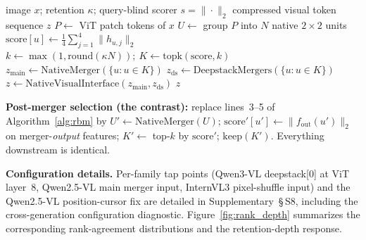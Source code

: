 \documentclass[journal]{IEEEtran}
\begin{document}
\begin{algorithm}[t]
  \caption{Rank-Before-Merge (RBM), one image}
  \label{alg:rbm}
  \begin{algorithmic}[1]
    \REQUIRE image $x$; retention $\kappa$; query-blind scorer $s = \|\cdot\|_2$
    \ENSURE compressed visual token sequence $z$
    \STATE $P \gets$ ViT patch tokens of $x$ 
    \STATE $U \gets$ group $P$ into $N$ native $2\!\times\!2$ units 
    \STATE $\mathrm{score}[u] \gets \frac14\sum_{j=1}^{4}\|h_{u,j}\|_2$ 
    \ENDFOR
    \STATE $k \gets \max(1,\mathrm{round}(\kappa N));\ K \gets \mathrm{topk}(\mathrm{score},k)$
    \STATE $z_{\mathrm{main}} \gets \mathrm{NativeMerger}(\{u : u \in K\})$ 
    \STATE $z_{\mathrm{ds}} \gets \mathrm{DeepstackMergers}(\{u : u \in K\})$ 
    \STATE $z \gets \mathrm{NativeVisualInterface}(z_{\mathrm{main}}, z_{\mathrm{ds}})$
    \RETURN $z$ 
  \end{algorithmic}
\end{algorithm}

\noindent\textbf{Post-merger selection (the contrast):} replace lines~3--5 of
Algorithm~\ref{alg:rbm} by $U' \gets \mathrm{NativeMerger}(U)$;
$\mathrm{score}'[u'] \gets \| f_{\mathrm{out}}(u') \|_2$ on merger-\emph{output}
features; $K' \gets$ top-$k$ by $\mathrm{score}'$; $\mathrm{keep}(K')$.
Everything downstream is identical.

\textbf{Configuration details.} Per-family tap points (Qwen3-VL
deepstack[0] at ViT layer~8, Qwen2.5-VL main merger input, InternVL3
pixel-shuffle input) and
the Qwen2.5-VL position-cursor fix are detailed in Supplementary~\S\,S8,
including the cross-generation configuration diagnostic.
Figure~\ref{fig:rank_depth} summarizes the corresponding rank-agreement
distributions and the retention-depth response.
\end{document}
